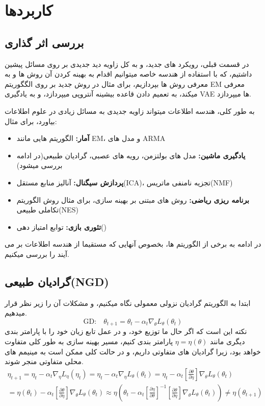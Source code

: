 \section{کاربردها}

\subsection{بررسی اثر گذاری}

در قسمت قبلی، رویکرد های جدید، و به کل زاویه دید جدیدی بر روی مسائل پیشین داشتیم، که با استفاده از هندسه خاصه میتوانیم اقدام به بهینه کردن آن روش ها و به معرفی روش ها بپردازیم، برای مثال در \cite{EM-info} روش جدید بر روی الگگوریتم EM معرفی میکند، \cite{Morales_2021} به تعمیم دادن قاعده بیشینه آنتروپی میپردازد، و \cite{han2020from} به یادگیری VAE ها میپردازد.

به طور کلی، هندسه اطلاعات میتواند زاویه جدیدی به مسائل زیادی در علوم اطلاعات بیاورد، برای مثال:

\begin{itemize}
	\item \textbf{آمار:} الگوریتم هایی مانند EM، و مدل های ARMA
	\item \textbf{یادگیری ماشین:} مدل های بولتزمن، رویه های عصبی، گرادیان طبیعی(در ادامه بررسی میشود)
	\item \textbf{پردازش سیگنال:} آنالیز منابع مستقل(ICA)، تجزیه نامنفی ماتریس(NMF)
	\item \textbf{برنامه ریزی ریاضی:} روش های مبتنی بر بهینه سازی، برای مثال روش الگوریتم تکاملی طبیعی(NES)
	\item \textbf{تئوری بازی:} توابع امتیاز دهی()
\end{itemize}

در ادامه به برخی از الگوریتم ها، بخصوص آنهایی که مستقیما از هندسه اطلاعات بر می آیند را بررسی میکنیم.

\subsection{گرادیان طبیعی(NGD)}

ابتدا به الگوریتم گرادیان نزولی معمولی نگاه میکنیم، و مشکلات آن را زیر نظر قرار میدهیم.
$$
	\text{GD:}\quad \theta_{t+1}=\theta_t-\alpha_t\nabla_\theta L_\theta(\theta_t)
$$
نکته این است که اگر حال ما توزیع خود، و در عمل تابع زیان خود را با پارامتر بندی دیگری مانند $\eta=\eta(\theta)$ پارامتر بندی کنیم، مسیر بهینه سازی به طور کلی متفاوت خواهد بود، زیرا گرادیان های متفاوتی داریم، و در حالت کلی ممکن است به مینیمم های محلی متفاوتی منجر شوند.
\begin{multline*}
	\eta_{t+1}=\eta_t-\alpha_t\nabla_\eta L_\eta(\eta_t)=\eta_t-\alpha_t\nabla_\eta L_\theta(\theta_t)
	=\eta_t-\alpha_t\left[\frac{\partial \theta}{\partial \eta}\right]\nabla_\theta L_\theta(\theta_t)\\=\eta(\theta_t)-\alpha_t\left[\frac{\partial \theta}{\partial \eta}\right]\nabla_\theta L_\theta(\theta_t)\approx\eta(\theta_t-\alpha_t\left[\frac{\partial \eta}{\partial \theta}\right]^{-1}\left[\frac{\partial \theta}{\partial \eta}\right]\nabla_\theta L_\theta(\theta_t))\neq \eta(\theta_{t+1})
\end{multline*}

